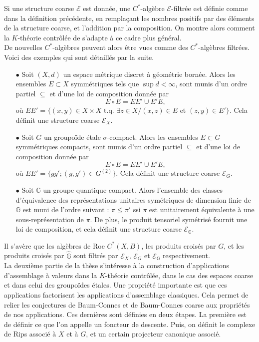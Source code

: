 Si une structure coarse $\mathcal E$ est donnée, une $C^*$-algèbre $\mathcal E$-filtrée est définie comme dans la définition précédente, en remplaçant les nombres positifs par des éléments de la structure coarse, et l'addition par la composition. On montre alors comment la $K$-théorie contrôlée de \cite{OY2} s'adapte à ce cadre plus général.\\

De nouvelles $C^*$-algèbres peuvent alors être vues comme des $C^*$-algèbres filtrées. Voici des exemples qui sont détaillés par la suite.
\begin{itemize} 
\item[$\bullet$] Soit $(X,d)$ un espace métrique discret à géométrie bornée. Alors les ensembles $E\subset X$ symmétriques tels que $\sup d<\infty$, sont munis d'un ordre partiel $\subseteq$ et d'une loi de composition donnée par 
\[E\circ E = EE'\cup E'E,\]
où $EE' = \{(x,y)\in X\times X \text{ t.q. }\exists z\in X / (x,z)\in E \text{ et }(z,y)\in E'\}$. Cela définit une structure coarse $\mathcal E_X$.
\item[$\bullet$] Soit $G$ un groupoïde étale $\sigma$-compact. Alors les ensembles $E\subset G$ symmétriques compacts, sont munis d'un ordre partiel $\subseteq$ et d'une loi de composition donnée par 
\[E\circ E = EE'\cup E'E,\]
où $EE' = \{gg' ; (g,g')\in G^{(2)}\}$. Cela définit une structure coarse $\mathcal E_G$.
\item[$\bullet$] Soit $\mathbb G$ un groupe quantique compact. Alors l'ensemble des classes d'équivalence des représentations unitaires symétriques de dimension finie de $\mathbb G$ est muni de l'ordre suivant : $\pi\leq \pi'$ ssi $\pi$ est unitairement équivalente à une sous-représentation de $\pi$. De plus, le produit tensoriel symétrisé fournit une loi de composition, et cela définit une structure coarse $\mathcal E_{\mathbb G}$.\\
\end{itemize} 

Il s'avère que les algèbres de Roe $C^*(X,B)$, les produits croisés par $G$, et les produits croisés par $\hat{\mathbb G}$ sont filtrés par $\mathcal E_X$, $\mathcal E_G$ et $\mathcal E_{\mathbb G}$ respectivement.\\


La deuxième partie de la thèse s'intéresse à la construction d'applications d'assemblage à valeurs dans la $K$-théorie contrôlée, dans le cas des espaces coarse et dans celui des groupoïdes étales. Une propriété importante est que ces applications factorisent les applications d'assemblage classiques. Cela permet de relier les conjectures de Baum-Connes et de Baum-Connes coarse aux propriétés de nos applications. Ces dernières sont définies en deux étapes. La première est de définir ce que l'on appelle un foncteur de descente. Puis, on définit le complexe de Rips associé à $X$ et à $G$, et un certain projecteur canonique associé. \\

